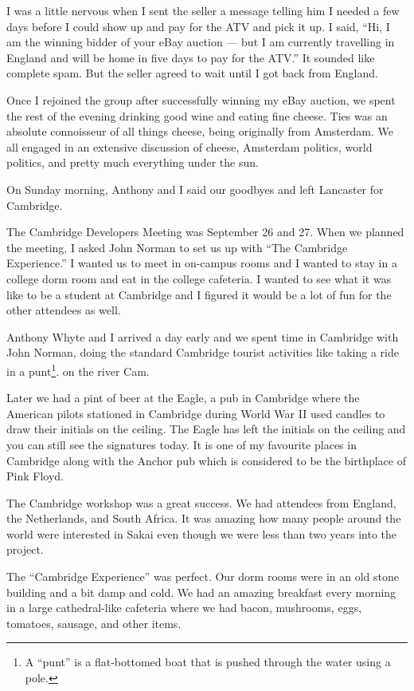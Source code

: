 \documentclass[12pt]{book}
\begin{document}
I was a little nervous when I sent the seller a message
telling him I needed a few days before I could show
up and pay for the ATV and pick it up.
I said, ``Hi, I am the winning bidder
of your eBay auction --- but I am currently travelling
in England and will be home in five days to pay for
the ATV.''  It sounded like complete spam.  But the seller
agreed to wait until I got back from England.

Once I rejoined the group after successfully winning
my eBay auction, we spent the rest of the evening drinking
good wine and eating fine cheese.  Ties was an absolute
connoisseur of all things cheese, being originally
from Amsterdam.   We all engaged in an extensive
discussion of cheese, Amsterdam politics, world
politics, and pretty much everything under the sun.

On Sunday morning, Anthony and I said our goodbyes and
left Lancaster for Cambridge.

The Cambridge Developers Meeting was September 26 and 27.
When we planned the meeting,
I asked John Norman to set us up with ``The Cambridge Experience.''
I wanted us to meet in on-campus rooms and I wanted to stay in a
college dorm room and eat in the college cafeteria.  I wanted
to see what it was like to be a student at Cambridge and I
figured it would be a lot of fun for the other attendees
as well.

Anthony Whyte and I arrived a day early and we spent time
in Cambridge with John Norman, doing the standard Cambridge
tourist activities like taking a ride in a punt\footnote{A 
``punt'' is a flat-bottomed boat
that is pushed through the water using a pole.}.
on the river Cam.

Later we had a pint of beer at the Eagle,
a pub in Cambridge where the American pilots stationed in
Cambridge during World War II used candles to draw their
initials on the ceiling.  The Eagle has left
the initials on the ceiling and you can still see the signatures
today.  It is one of my favourite places in
Cambridge along with the Anchor pub which is considered
to be the birthplace of Pink Floyd.

The Cambridge workshop was a great success.
We had attendees from England, the Netherlands,
and South Africa.   It was amazing how many people
around the world were interested in Sakai even though we
were less than two years into the project.

The ``Cambridge Experience'' was perfect.  Our dorm rooms
were in an old stone building and a bit damp and cold.
We had an amazing breakfast every morning in a large
cathedral-like cafeteria where we had bacon,
mushrooms, eggs, tomatoes, sausage, and other items.
\end{document}

